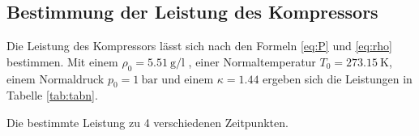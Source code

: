 \subsection{Bestimmung der Leistung des Kompressors}

Die Leistung des Kompressors lässt sich nach den Formeln \eqref{eq:P} und \eqref{eq:rho} bestimmen. Mit einem $\rho_0 = \SI{5.51}{\gram\per\litre}$ \cite{V206}, einer Normaltemperatur $T_0 = \SI{273.15}{\kelvin}$,  einem Normaldruck $p_0 = \SI{1}{\bar}$ und einem $\kappa = 1.44$ \cite{V206} ergeben sich die Leistungen in Tabelle \ref{tab:tabn}.

 \begin{table}
  \centering
  \caption{Die bestimmte Leistung zu 4 verschiedenen Zeitpunkten.}
  \label{tab:Leistung}
\end{table}
